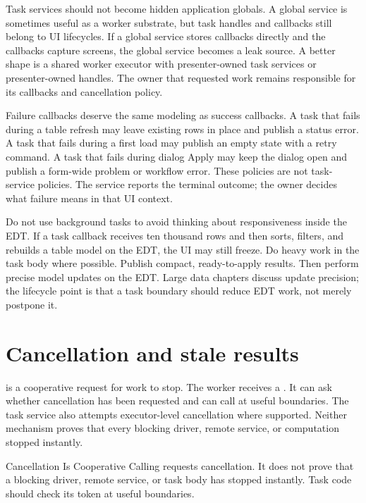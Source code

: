 Task services should not become hidden application globals. A global service
is sometimes useful as a worker substrate, but task handles and callbacks still
belong to UI lifecycles. If a global service stores callbacks directly and the
callbacks capture screens, the global service becomes a leak source. A better
shape is a shared worker executor with presenter-owned task services or
presenter-owned handles. The owner that requested work remains responsible for
its callbacks and cancellation policy.

Failure callbacks deserve the same modeling as success callbacks. A task that
fails during a table refresh may leave existing rows in place and publish a
status error. A task that fails during a first load may publish an empty state
with a retry command. A task that fails during dialog Apply may keep the dialog
open and publish a form-wide problem or workflow error. These policies are not
task-service policies. The service reports the terminal outcome; the owner
decides what failure means in that UI context.

Do not use background tasks to avoid thinking about responsiveness inside the
EDT. If a task callback receives ten thousand rows and then sorts, filters, and
rebuilds a table model on the EDT, the UI may still freeze. Do heavy work in
the task body where possible. Publish compact, ready-to-apply results. Then
perform precise model updates on the EDT. Large data chapters discuss update
precision; the lifecycle point is that a task boundary should reduce EDT work,
not merely postpone it.

\section{Cancellation and stale results}

 is a cooperative request for work to
stop. The worker receives a . It can ask whether
cancellation has been requested and can call 
at useful boundaries. The task service also attempts executor-level
cancellation where supported. Neither mechanism proves that every blocking
driver, remote service, or computation stopped instantly.

\begin{pitfallbox}{Cancellation Is Cooperative}
Calling  requests cancellation. It does not prove that a blocking
driver, remote service, or task body has stopped instantly. Task code should
check its token at useful boundaries.
\end{pitfallbox}

